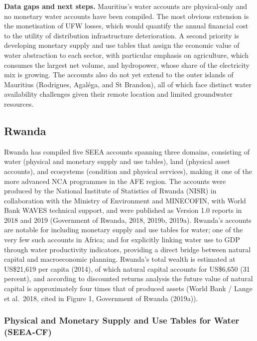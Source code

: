 \documentclass[
  letterpaper,
  DIV=11,
  numbers=noendperiod]{scrartcl}
\begin{document}
\textbf{Data gaps and next steps.} Mauritius's water accounts are
physical-only and no monetary water accounts have been compiled. The
most obvious extension is the monetisation of UFW losses, which would
quantify the annual financial cost to the utility of distribution
infrastructure deterioration. A second priority is developing monetary
supply and use tables that assign the economic value of water
abstraction to each sector, with particular emphasis on agriculture,
which consumes the largest net volume, and hydropower, whose share of
the electricity mix is growing. The accounts also do not yet extend to
the outer islands of Mauritius (Rodrigues, Agaléga, and St Brandon), all
of which face distinct water availability challenges given their remote
location and limited groundwater resources.

\subsection{Rwanda}\label{rwanda}

Rwanda has compiled five SEEA accounts spanning three domains,
consisting of water (physical and monetary supply and use tables), land
(physical asset accounts), and ecosystems (condition and physical
services), making it one of the more advanced NCA programmes in the AFE
region. The accounts were produced by the National Institute of
Statistics of Rwanda (NISR) in collaboration with the Ministry of
Environment and MINECOFIN, with World Bank WAVES technical support, and
were published as Version 1.0 reports in 2018 and 2019 (Government of
Rwanda, 2018, 2019b, 2019a). Rwanda's accounts are notable for including
monetary supply and use tables for water; one of the very few such
accounts in Africa; and for explicitly linking water use to GDP through
water productivity indicators, providing a direct bridge between natural
capital and macroeconomic planning. Rwanda's total wealth is estimated
at US\$21,619 per capita (2014), of which natural capital accounts for
US\$6,650 (31 percent), and according to discounted returns analysis the
future value of natural capital is approximately four times that of
produced assets (World Bank / Lange et al.~2018, cited in Figure 1,
Government of Rwanda (2019a)).

\subsubsection{Physical and Monetary Supply and Use Tables for Water
(SEEA-CF)}\label{physical-and-monetary-supply-and-use-tables-for-water-seea-cf}
\end{document}
